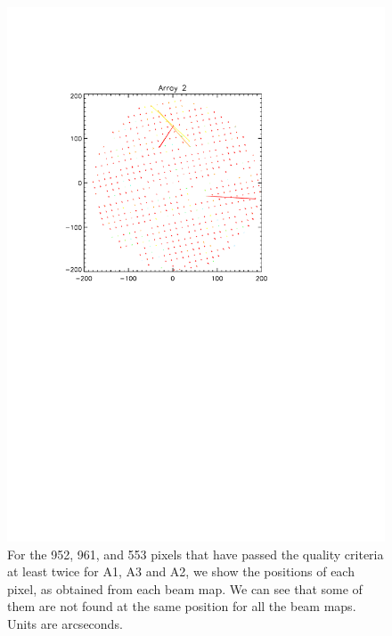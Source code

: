 \begin{figure}
\begin{center}
\includegraphics[trim=2cm 14cm 5cm 4cm, clip=true,width=0.6\linewidth]{Figures/A2_positions.pdf}
\caption{For the 952, 961, and 553 pixels that have passed the quality criteria at least twice for A1, A3 and A2, we show the positions of each pixel, as obtained from each beam map. We can see that some of them are not found at the same position for all the beam maps. Units are arcseconds.}
\label{fig:jumping_kids}
\end{center}
\end{figure}

